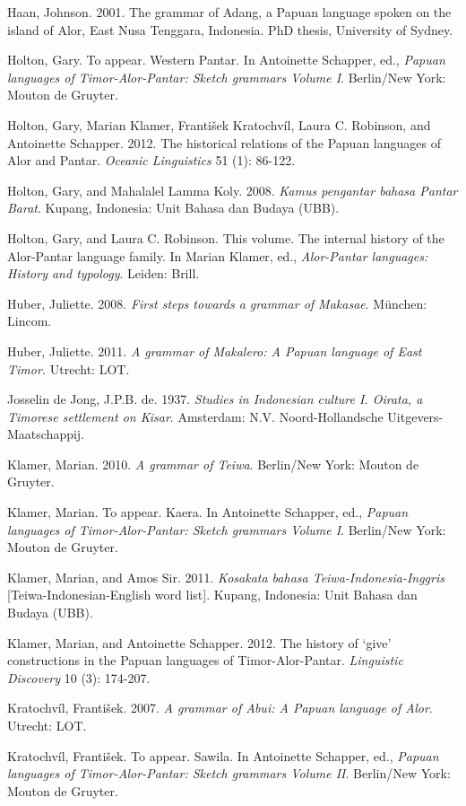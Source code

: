 Haan, Johnson. 2001. The grammar of Adang, a Papuan language spoken on the island of Alor, East Nusa Tenggara, Indonesia. PhD thesis, University of Sydney.

Holton, Gary. To appear. Western Pantar. In Antoinette Schapper, ed., \textit{Papuan languages of Timor-Alor-Pantar: Sketch grammars Volume I}. Berlin/New York: Mouton de Gruyter.

Holton, Gary, Marian Klamer, Franti\v{s}ek Kratochv\'il, Laura C. Robinson, and Antoinette Schapper. 2012. The historical relations of the Papuan languages of Alor and Pantar. \textit{Oceanic Linguistics} 51 (1): 86-122.

Holton, Gary, and Mahalalel Lamma Koly. 2008. \textit{Kamus pengantar bahasa Pantar Barat}. Kupang, Indonesia: Unit Bahasa dan Budaya (UBB).

Holton, Gary, and Laura C. Robinson. This volume. The internal history of the Alor-Pantar language family. In Marian Klamer, ed., \textit{Alor-Pantar languages: History and typology}. Leiden: Brill.

Huber, Juliette. 2008. \textit{First steps towards a grammar of Makasae}. M\"unchen: Lincom.

Huber, Juliette. 2011. \textit{A grammar of Makalero: A Papuan language of East Timor}\textit{.} Utrecht: LOT.

Josselin de Jong, J.P.B. de. 1937. \textit{Studies in Indonesian culture I. Oirata, a Timorese settlement on Kisar}. Amsterdam: N.V. Noord-Hollandsche Uitgevers-Maatschappij.

Klamer, Marian. 2010. \textit{A grammar of Teiwa}. Berlin/New York: Mouton de Gruyter.

Klamer, Marian. To appear. Kaera. In Antoinette Schapper, ed., \textit{Papuan languages of Timor-Alor-Pantar: Sketch grammars Volume I}. Berlin/New York: Mouton de Gruyter. 

Klamer, Marian, and Amos Sir. 2011. \textit{Kosakata bahasa Teiwa-Indonesia-Inggris} [Teiwa-Indonesian-English word list]. Kupang, Indonesia: Unit Bahasa dan Budaya (UBB).

Klamer, Marian, and Antoinette Schapper. 2012. The history of {\textquoteleft}give{\textquoteright} constructions in the Papuan languages of Timor-Alor-Pantar. \textit{Linguistic Discovery} 10 (3): 174-207. 

Kratochv\'il, Franti\v{s}ek. 2007. \textit{A grammar of Abui: A Papuan language of Alor}. Utrecht: LOT.

Kratochv\'il, Franti\v{s}ek. To appear. Sawila. In Antoinette Schapper, ed., \textit{Papuan languages of Timor-Alor-Pantar: Sketch grammars Volume II}. Berlin/New York: Mouton de Gruyter.

